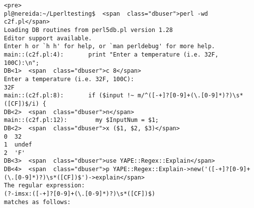 \begin{verbatim}
<pre>
pl@nereida:~/Lperltesting$  <span  class="dbuser">perl -wd c2f.pl</span>
Loading DB routines from perl5db.pl version 1.28
Editor support available.
Enter h or `h h' for help, or `man perldebug' for more help.
main::(c2f.pl:4):       print "Enter a temperature (i.e. 32F, 100C):\n";
DB<1>  <span  class="dbuser">c 8</span>
Enter a temperature (i.e. 32F, 100C):
32F
main::(c2f.pl:8):       if ($input !~ m/^([-+]?[0-9]+(\.[0-9]*)?)\s*([CF])$/i) {
DB<2>  <span  class="dbuser">n</span>
main::(c2f.pl:12):        my $InputNum = $1;
DB<2>  <span  class="dbuser">x ($1, $2, $3)</span>
0  32
1  undef
2  'F'
DB<3>  <span  class="dbuser">use YAPE::Regex::Explain</span>
DB<4>  <span  class="dbuser">p YAPE::Regex::Explain->new('([-+]?[0-9]+(\.[0-9]*)?)\s*([CF])$')->explain</span>
The regular expression:
(?-imsx:([-+]?[0-9]+(\.[0-9]*)?)\s*([CF])$)
matches as follows:


\end{verbatim}
